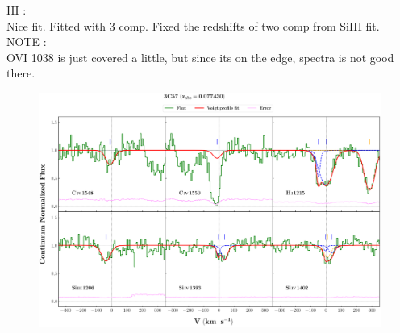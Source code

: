 \documentclass[12pt]{report}
\begin{document}
HI :  \\  \hspace*{1.5cm}
        Nice fit. Fitted with 3 comp. Fixed the redshifts of two comp from SiIII fit.  \\

NOTE  :  \\  \hspace*{1.5cm} OVI 1038 is just covered a little, but since its on the edge, spectra is not good there.  \\




\newpage

\begin{landscape}

\begin{figure}
    \centering
    \vspace{-20mm}
    \hspace*{-35mm}
    \includegraphics[width=1.25\linewidth]{System-Plots/3C57_z=0.077430_sys_plot.png}
\end{figure}

\end{landscape}
\end{document}
